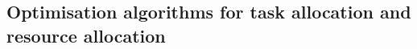\subsection{Optimisation algorithms for task allocation and resource allocation}
\label{section:algorithm_summaries}
\newcommand{\varAction}[2]{\varSymbol{a}{#1}{#2}}
\newcommand{\functionExec}[2]{
	\ifx &#1&
	\texttt{exec}(\varAtomicTask{}{})
	\else
	\texttt{exec}(#1, #2)
	\fi
}
\newcommand{\functionAlloc}[2]{
	\ifx &#1&
	\texttt{alloc}(\varAtomicTask{}{}, \varAgent{}{})
	\else
	\texttt{alloc}(#1, #2)
	\fi
}
\newcommand{\functionInfo}[2]{
	\ifx &#1&
	\texttt{info}(\varAgent{}{})
	\else
	\texttt{info}(#1)
	\fi
}
\newcommand{\functionLink}[2]{
	\ifx &#1&
	\texttt{link}(\varAgent{}{})
	\else
	\texttt{link}(#1)
	\fi
}
\newcommand{\functionATARIA}[2]{
	\functionSignature{
		ataria_{\varAgent{}{}}
	}{
		\varAtomicTask{}{}, \varAgent{self}{}
	}
}	
\newcommand{\formalATARIA}[2]{
	\functionFormal{\texttt{ataria}_{\varAgent{}{}}}
	{\setAtomicTask{}{} \times \setAgents{}{}}
	{
		\texttt{exec}(\setAtomicTask{}{})
		\times \texttt{alloc}(\setAtomicTask{}{}, \setAgents{}{})
		\times \texttt{info}(\setAgents{}{})
		\times \texttt{link}(\setAgents{}{})
	}
}
\newcommand{\functionMGRAOWeighting}[2]{\texttt{mgrao-weight}(\varAtomicTask{}{}, \varAgent{self}{})}
\newcommand{\formalMGRAOWeighting}[2]{
	\functionFormal{\texttt{mgrao-weight}_{\varAgent{}{}}}
	{\setAtomicTask{}{} \times \setRealNumbers{}{}}
	{
		\setRealNumbers{}{}
	}
}
\newcommand{\functionMGRAOUpdate}[2]{
	\texttt{mgrao-update}_{\varAgent{}{}}
	(\varAtomicTask{}{}, \functionTaskAbsoluteValue{}{})}
\newcommand{\formalMGRAOUpdate}[2]{
	\functionFormal{\texttt{mgrao-update}_{\varAgent{}{}}}
	{\setAtomicTask{}{} \times \setRealNumbers{}{}}
	{
		\setRealNumbers{}{}
	}
}

